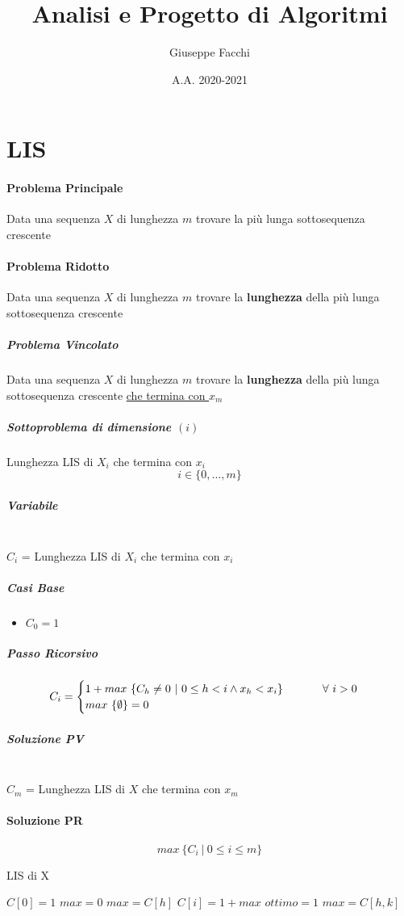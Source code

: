 \documentclass[12pt]{article}
\title{Analisi e Progetto di Algoritmi}
\author{Giuseppe Facchi}
\date{A.A. 2020-2021}
\begin{document}
\maketitle
\newpage
\tableofcontents
\newpage

\section{LIS}
\paragraph{Problema Principale}
Data una sequenza $X$ di lunghezza $m$ trovare la più lunga sottosequenza crescente
\paragraph{Problema Ridotto}
Data una sequenza $X$ di lunghezza $m$ trovare la \textbf{lunghezza} della più lunga sottosequenza crescente
\subparagraph{Problema Vincolato}
Data una sequenza $X$ di lunghezza $m$ trovare la \textbf{lunghezza} della più lunga sottosequenza crescente \underline{che termina con $x_m$}
\subparagraph{Sottoproblema di dimensione $(i)$} Lunghezza LIS di $X_i$ che termina con $x_i$
$$i \in \{0, \dots, m\}$$
\subparagraph{Variabile}\mbox{}\\
$C_{i}$ = Lunghezza LIS di $X_i$ che termina con $x_i$
\subparagraph{Casi Base}
\begin{itemize}
    \item $C_{0} = 1$
\end{itemize}
\subparagraph{Passo Ricorsivo}
\[
    C_{i}=\begin{cases}
        1 + max \ \{C_{h}\neq 0 \ | \ 0\leq h<i \land x_h<x_i\}$ \hspace{1cm} $\forall \ i>0 \\
        max \ \{\emptyset\} = 0
    \end{cases}
\]
\subparagraph{Soluzione PV}\mbox{}\\
$C_{m}$ = Lunghezza LIS di $X$ che termina con $x_m$
\paragraph{Soluzione PR}
$$max \ \{C_{i} \ | \ 0 \leq i \leq m\}$$
\newpage
\begin{algorithm}
    \caption{LIS di X}
    \begin{algorithmic}
        \STATE $C[0]=1$
        \STATE $max=0$
        \STATE $max=C[h]$
        \ENDIF
        \ENDFOR
        \STATE $C[i]=1+max$
        \ENDFOR
        \STATE $ottimo=1$
        \STATE $max = C[h,k]$
        \ENDIF
        \ENDFOR
    \end{algorithmic}
\end{algorithm}
\newpage
\end{document}
